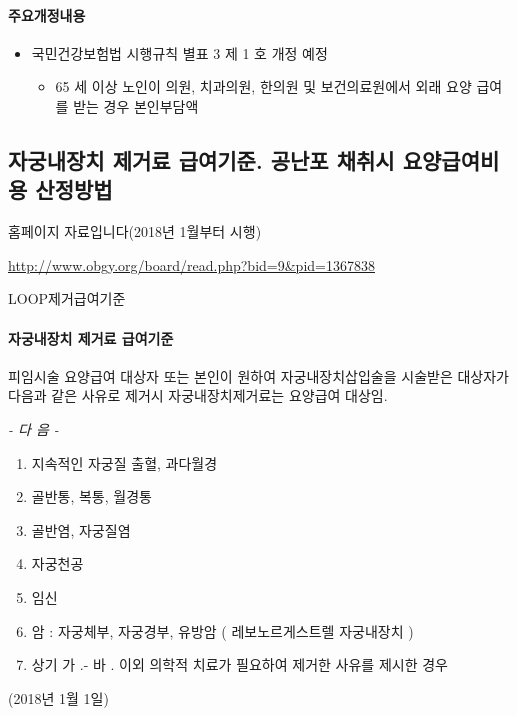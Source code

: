 \paragraph{주요개정내용}
\begin{itemize}[○]\tightlist
\item 국민건강보험법 시행규칙 별표 3 제 1 호 개정 예정
	\begin{itemize}\tightlist
	\item 65 세 이상 노인이 의원, 치과의원, 한의원 및 보건의료원에서 외래 요양 급여를 받는 경우 본인부담액
	\end{itemize}
\end{itemize}


\subsection{자궁내장치 제거료 급여기준. ​공난포 채취시 요양급여비용 산정방법}
홈페이지 자료입니다(2018년 1월부터 시행)\par
\url{http://www.obgy.org/board/read.php?bid=9&pid=1367838}
\begin{commentbox}{LOOP제거급여기준}
\paragraph{자궁내장치 제거료 급여기준}\par
피임시술 요양급여 대상자 또는 본인이 원하여 자궁내장치삽입술을 시술받은 대상자가 다음과 같은 사유로 제거시 자궁내장치제거료는 요양급여 대상임.\par

\emph{- 다 음 -}
\begin{enumerate}[가.]\tightlist
\item 지속적인 자궁\cntrdot{}질 출혈, 과다월경
\item 골반통, 복통, 월경통
\item 골반염, 자궁\cntrdot{}질염
\item 자궁천공
\item 임신
\item 암 : 자궁체부, 자궁경부, 유방암 ( 레보노르게스트렐 자궁내장치 )
\item  상기 가 .- 바 . 이외 의학적 치료가 필요하여 제거한 사유를 제시한 경우
\end{enumerate}
(2018년 1월 1일)
\end{commentbox}


